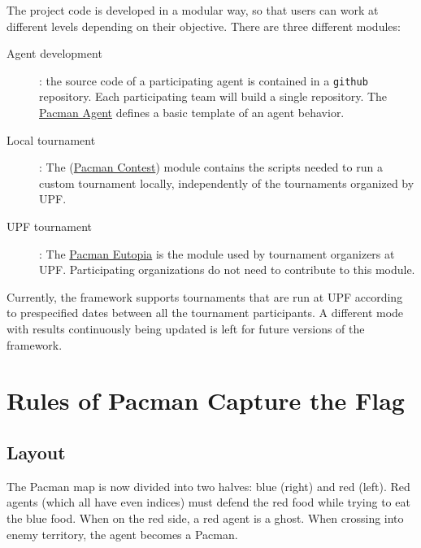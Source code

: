 \documentclass[11pt]{article}
\begin{document}
The project code is developed in a modular way, so that users can work at different levels depending on their objective. There are three different modules:
\begin{description}
    \item [Agent development]: the source code of a participating agent is contained in a \texttt{github} repository. Each participating team will build a single repository. The \href{https://github.com/aig-upf/pacman-agent}{Pacman Agent} defines a basic template of an agent behavior.

    \item [Local tournament]:
    The (\href{https://github.com/aig-upf/pacman-contest}{Pacman Contest}) module contains the scripts needed to run a custom tournament locally, independently of the tournaments organized by UPF.

    \item [UPF tournament]:
    The \href{https://github.com/aig-upf/pacman-eutopia}{Pacman Eutopia} is the module used by tournament organizers at UPF. Participating organizations do not need to contribute to this module.
\end{description}

Currently, the framework supports tournaments that are run at UPF according to prespecified dates between all the tournament participants. A different mode with results continuously being updated is left for future versions of the framework.



\section{Rules of Pacman Capture the Flag}
\subsection{Layout}
The Pacman map is now divided into two halves: blue (right) and red (left). Red agents (which all have even indices) must defend the red food while trying to eat the blue food. When on the red side, a red agent is a ghost. When crossing into enemy territory, the agent becomes a Pacman.
\end{document}
